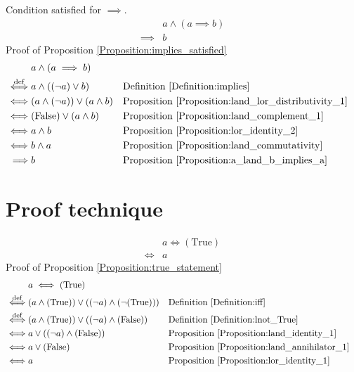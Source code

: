 \begin{prop}
\label{Proposition:implies_satisfied}
Condition satisfied for $\implies$.
\begin{align*}
& a \land (a \implies b) \\
\implies & b
\end{align*}
Proof of Proposition \ref{Proposition:implies_satisfied}
\begin{align*}
& a \land (a \implies b) \\
\overset{\operatorname{def}}{\iff} & a \land ((\lnot a) \lor b)
& & \text{Definition \ref{Definition:implies}} \\
\iff & (a \land (\lnot a)) \lor (a \land b)
& & \text{Proposition \ref{Proposition:land_lor_distributivity_1}} \\
\iff & (\text{False}) \lor (a \land b)
& & \text{Proposition \ref{Proposition:land_complement_1}} \\
\iff & a \land b
& & \text{Proposition \ref{Proposition:lor_identity_2}} \\
\iff & b \land a
& & \text{Proposition \ref{Proposition:land_commutativity}} \\
\implies & b
& & \text{Proposition \ref{Proposition:a_land_b_implies_a}} \\
\end{align*}
\end{prop}

\section{Proof technique}
\begin{prop}
\label{Proposition:true_statement}
\begin{align*}
& a \iff (\text{True}) \\
\iff & a
\end{align*}
Proof of Proposition \ref{Proposition:true_statement}
\begin{align*}
& a \iff (\text{True}) \\
\overset{\operatorname{def}}{\iff} & (a \land (\text{True})) \lor ((\lnot a) \land (\lnot (\text{True})))
& & \text{Definition \ref{Definition:iff}} \\
\overset{\operatorname{def}}{\iff} & (a \land (\text{True})) \lor ((\lnot a) \land (\text{False}))
& & \text{Definition \ref{Definition:lnot_True}} \\
\iff & a \lor ((\lnot a) \land (\text{False}))
& & \text{Proposition \ref{Proposition:land_identity_1}} \\
\iff & a \lor (\text{False})
& & \text{Proposition \ref{Proposition:land_annihilator_1}} \\
\iff & a
& & \text{Proposition \ref{Proposition:lor_identity_1}} \\
\end{align*}
\end{prop}

